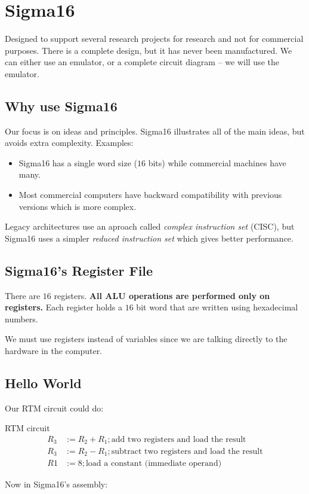 \section{Sigma16}\label{sec:sigma16}

Designed to support several research projects for research and not for commercial purposes.
There is a complete design, but it has never been manufactured.
We can either use an emulator, or a complete circuit diagram -- we will use the emulator.

\subsection{Why use Sigma16}\label{sub:why_use_sigma16}

Our focus is on ideas and principles.
Sigma16 illustrates all of the main ideas, but avoids extra complexity.
Examples:
\begin{itemize}
	\item Sigma16 has a single word size (\(16\) bits) while commercial machines have many.
	\item Most commercial computers have backward compatibility with previous versions which is more complex.
\end{itemize}
Legacy architectures use an aproach called \emph{complex instruction set} (CISC), but Sigma16 uses a simpler \emph{reduced instruction set} which gives better performance.

\subsection{Sigma16's Register File}\label{sub:sigma16_s_register_file}

There are \(16\) registers.
\textbf{All ALU operations are performed only on registers.}
Each register holds a \(16\) bit word that are written using hexadecimal numbers.

We must use registers instead of variables since we are talking directly to the hardware in the computer.

\subsection{Hello World}\label{sub:hello_world}

Our RTM circuit could do:
\begin{highlight}{RTM circuit}
	\begin{align*}
		R_3 & := R_2+R_1 ; \text{add two registers and load the result}     \\
		R_3 & :=R_2-R_1 ; \text{subtract two registers and load the result} \\
		R1  & := 8 ; \text{load a constant (immediate operand)}
	\end{align*}
\end{highlight}
Now in Sigma16's assembly:


